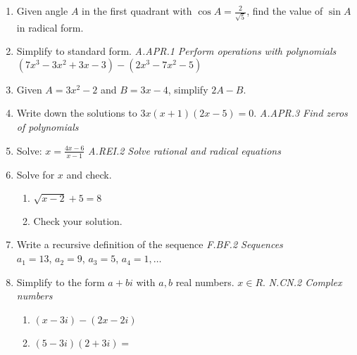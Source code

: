 \documentclass[12pt, twoside]{article}
\begin{document}
\begin{enumerate}[itemsep=0.5cm]
\item Given angle $A$ in the first quadrant with $\displaystyle \cos A=\frac{2}{\sqrt{5}}$, find the value of $\sin A$ in radical form.

\newpage
\item Simplify to standard form. \hfill \emph{A.APR.1 Perform operations with polynomials} \\[0.25cm]
$(7x^3 - 3x^2 + 3x - 3) - (2x^3 - 7x^2 - 5)$ \vspace{2cm}


\item Given $A = 3x^2-2$ and $B = 3x-4$, simplify $2A - B$. \vspace{5cm}

\item Write down the solutions to $3x(x + 1)(2x - 5) = 0$. \hfill \emph{A.APR.3 Find zeros of polynomials}
\vspace{2cm} 

\item Solve: $\displaystyle  x = \frac{4x-6}{x-1}$ \hfill \emph{A.REI.2 Solve rational and radical equations} \vspace{3cm} 

\item Solve for $x$ and check.
    \begin{multicols}{2}
    \begin{enumerate}[itemsep=0.5cm]
        \item  $\sqrt{x -2} + 5 = 8$
        \item Check your solution.
    \end{enumerate}
    \end{multicols}

\newpage
\item Write a recursive definition of the sequence \hfill \emph{F.BF.2 Sequences} \\[0.25cm]
$a_1 = 13$, $a_2 = 9$, $a_3 = 5$, $a_4 = 1, \ldots$ \vspace{2.5cm}

\item Simplify to the form $a+bi$ with $a,b$ real numbers. $x \in R$. \hfill \emph{N.CN.2 Complex numbers}
    \begin{multicols}{2}
        \begin{enumerate}[itemsep=1.5cm]
            \item $(x - 3i) - (2x - 2i)$
            \item $(5 - 3i)(2 + 3i)=$
        \end{enumerate}
    \end{multicols}  \vspace{5cm}


\end{enumerate}
\end{document}
